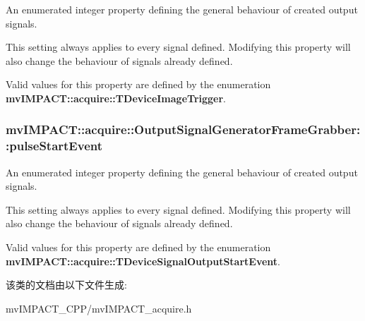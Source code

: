 An enumerated integer property defining the general behaviour of created output signals. 

This setting always applies to every signal defined. Modifying this property will also change the behaviour of signals already defined.

Valid values for this property are defined by the enumeration {\bfseries mv\+I\+M\+P\+A\+C\+T\+::acquire\+::\+T\+Device\+Image\+Trigger}. \hypertarget{classmv_i_m_p_a_c_t_1_1acquire_1_1_output_signal_generator_frame_grabber_aa2102a162653d84112dcebbd90086ad4}{
\subsubsection[{pulse\+Start\+Event}]{ mv\+I\+M\+P\+A\+C\+T\+::acquire\+::\+Output\+Signal\+Generator\+Frame\+Grabber\+::pulse\+Start\+Event}}\label{classmv_i_m_p_a_c_t_1_1acquire_1_1_output_signal_generator_frame_grabber_aa2102a162653d84112dcebbd90086ad4}


An enumerated integer property defining the general behaviour of created output signals. 

This setting always applies to every signal defined. Modifying this property will also change the behaviour of signals already defined.

Valid values for this property are defined by the enumeration {\bfseries mv\+I\+M\+P\+A\+C\+T\+::acquire\+::\+T\+Device\+Signal\+Output\+Start\+Event}. 

该类的文档由以下文件生成\+:\begin{DoxyCompactItemize}
\item 
mv\+I\+M\+P\+A\+C\+T\+\_\+\+C\+P\+P/mv\+I\+M\+P\+A\+C\+T\+\_\+acquire.\+h\end{DoxyCompactItemize}
